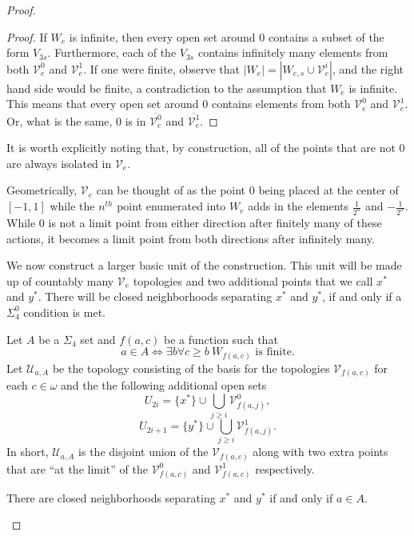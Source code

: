 \documentclass[10pt,a4paper]{amsart}
\begin{document}
\begin{proof}
\begin{proof}
    If $W_e$ is infinite, then every open set around $0$ contains a subset of the form $V_{3s}$.
    Furthermore, each of the $V_{3s}$ contains infinitely many elements from both $\mathcal{V}_e^0$ and $\mathcal{V}_e^1$.
    If one were finite, observe that $|W_e|=|W_{e,s}\cup \mathcal{V}_e^i|$, and the right hand side would be finite, a contradiction to the assumption that $W_e$ is infinite.
    This means that every open set around $0$ contains elements from both $\mathcal{V}_e^0$ and $\mathcal{V}_e^1$.
    Or, what is the same, $0$ is in $\overline{\mathcal{V}_e^0}$ and $\overline{\mathcal{V}_e^1}$.
    \end{proof}


        It is worth explicitly noting that, by construction, all of the points that are not $0$ are always isolated in $\mathcal{V}_e$.

    Geometrically, $\mathcal{V}_e$ can be thought of as the point $0$ being placed at the center of $[-1,1]$ while the $n^{th}$ point enumerated into $W_e$ adds in the elements $\frac{1}{2^n}$ and $-\frac{1}{2^n}$.
    While $0$ is not a limit point from either direction after finitely many of these actions, it becomes a limit point from both directions after infinitely many.

    We now construct a larger basic unit of the construction.
    This unit will be made up of countably many $\mathcal{V}_e$ topologies and two additional points that we call $x^*$ and $y^*$.
    There will be closed neighborhoods separating $x^*$ and $y^*$, if and only if a $\Sigma_4^0$ condition is met.

    Let $A$ be a $\Sigma_4$ set and $f(a,c)$ be a function such that
    \[a\in A\iff \exists b\forall c\geq b ~ W_{f(a,c)} \text{ is finite.}\]
    Let $\mathcal{U}_{a,A}$ be the topology consisting of the basis for the topologies $\mathcal{V}_{f(a,c)}$ for each $c\in\omega$ and the the following additional open sets
    \[U_{2i}=\{x^*\}\cup \bigcup_{j\geq i}\mathcal{V}^0_{f(a,j)},\]
    \[U_{2i+1}=\{y^*\}\cup \bigcup_{j\geq i}\mathcal{V}^1_{f(a,j)}.\]
    In short, $\mathcal{U}_{a,A}$ is the disjoint union of the $\mathcal{V}_{f(a,c)}$ along with two extra points that are ``at the limit'' of the $\mathcal{V}^0_{f(a,c)}$ and $\mathcal{V}^1_{f(a,c)}$ respectively.

    \begin{claim}\label{claim:biggerUnit1/2}
        There are closed neighborhoods separating $x^*$ and $y^*$ if and only if $a\in A$.
    \end{claim}


\end{proof}
\end{document}
